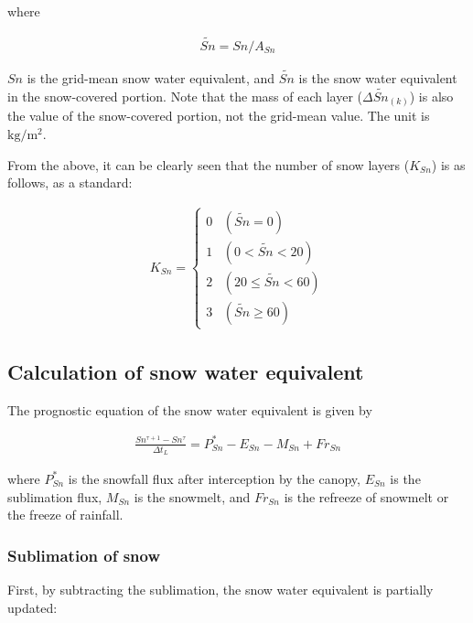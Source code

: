 where

\begin{eqnarray}
\widetilde{Sn} =  Sn / A_{Sn} \label{8-10}
\end{eqnarray}

\(Sn\) is the grid-mean snow water equivalent, and \(\widetilde{Sn}\) is the snow water equivalent in the snow-covered portion. Note that the mass of each layer (\(\Delta {\widetilde{Sn}}_{(k)}\)) is
also the value of the snow-covered portion, not the grid-mean value. The unit is \(\mathrm{kg/m^2}\).

From the above, it can be clearly seen that the number of snow layers (\(K_{Sn}\)) is as follows, as a standard:

\begin{eqnarray}
 K_{Sn} = \left\{
\begin{array}{ll}
 0 \;\;\; (\widetilde{Sn} = 0)\\
 1 \;\;\; (0< \widetilde{Sn} < 20)\\
 2 \;\;\; (20 \leq \widetilde{Sn} < 60)\\
 3 \;\;\; (\widetilde{Sn} \geq 60)
\end{array}
\right. \label{8-11}
\end{eqnarray}

\hypertarget{calculation-of-snow-water-equivalent}{%
\subsection{Calculation of snow water equivalent}\label{calculation-of-snow-water-equivalent}}

The prognostic equation of the snow water equivalent is given by

\begin{eqnarray}
 \frac{Sn^{\tau+1}-Sn^{\tau}}{\Delta t_L} = P_{Sn}^{\ast} - E_{Sn} - M_{Sn} + Fr_{Sn} \label{8-12}
\end{eqnarray}

where \(P_{Sn}^{\ast}\) is the snowfall flux after interception by the canopy, \(E_{Sn}\) is the sublimation flux, \(M_{Sn}\) is the snowmelt, and \(Fr_{Sn}\) is the refreeze of snowmelt or the freeze
of rainfall.

\hypertarget{sublimation-of-snow}{%
\subsubsection{Sublimation of snow}\label{sublimation-of-snow}}

First, by subtracting the sublimation, the snow water equivalent is partially updated:

